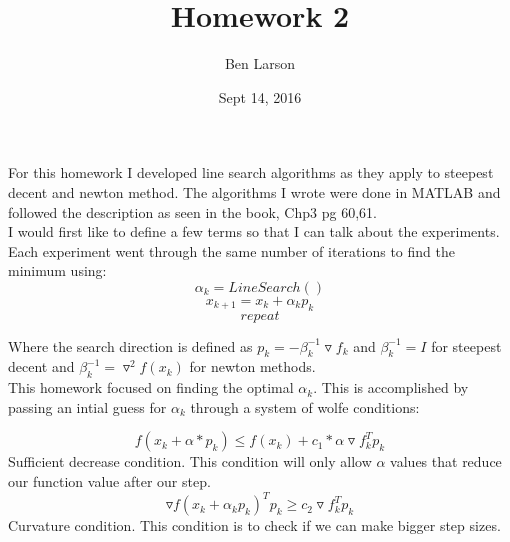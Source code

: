 \documentclass[7pt]{article}
\author{Ben Larson}
\title{Homework 2 }
\date{Sept 14, 2016}
\begin{document}
	\maketitle
	For this homework I developed line search algorithms as they apply to steepest decent and newton method. The algorithms I wrote were done in MATLAB and followed the description as seen in the book, Chp3 pg 60,61. \\
	I would first like to define a few terms so that I can talk about the experiments. \\
	Each experiment went through the same number of iterations to find the minimum using:
	$$ \alpha_k = LineSearch()$$
	$$ x_{k+1} = x_k + \alpha_k p_k $$
	$$repeat$$
	
	Where the search direction is defined as $p_k = -\beta_k^{-1}\triangledown f_k$  and $\beta_k^{-1} = I$ for steepest decent and $\beta_k^{-1}= \triangledown^2f(x_k)$ for newton methods. \\
	This homework focused on finding the optimal $\alpha_k$. This is accomplished by passing an intial guess for $\alpha_k$ through a system of wolfe conditions:
	\begin{center}
	$$ f(x_k + \alpha*p_k) \le f(x_k)+c_1*\alpha \triangledown f_k^{T} p_k $$ Sufficient decrease condition. This condition will only allow $\alpha$ values that reduce our function value after our step. 
	$$ \triangledown f(x_k+\alpha_k p_k)^{T} p_k \ge c_2 \triangledown f_k^T p_k $$ Curvature condition. This condition is to check if we can make bigger step sizes. 
	\end{center}
	
\end{document}
